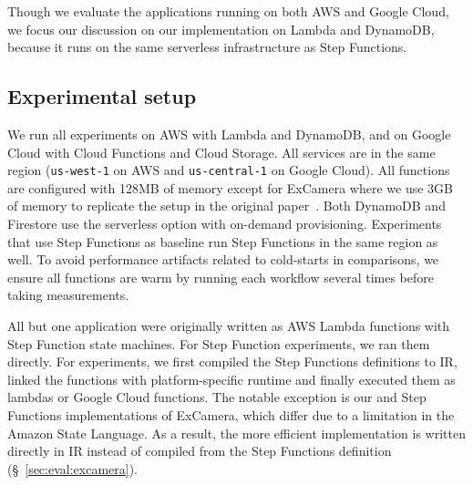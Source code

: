 



Though we evaluate the applications running on both AWS and Google Cloud, we
focus our discussion on our \name{} implementation on Lambda and DynamoDB,
because it runs on the same serverless infrastructure as Step Functions.

\subsection{Experimental setup}

We run all experiments on AWS with Lambda and DynamoDB, and on Google Cloud
with Cloud Functions and Cloud Storage. All services are in the same region
(\texttt{us-west-1} on AWS and \texttt{us-central-1} on Google Cloud). All
functions are configured with 128MB of memory except for ExCamera where we use
3GB of memory to replicate the setup in the original paper~\cite{excamera,
gg-atc}. Both DynamoDB and Firestore use the serverless option with on-demand
provisioning. Experiments that use Step Functions as baseline run Step
Functions in the same region as well. To avoid performance artifacts related
to cold-starts in comparisons, we ensure all functions are warm by running
each workflow several times before taking measurements.

All but one application were originally written as AWS Lambda functions with
Step Function state machines. For Step Function experiments, we ran them
directly. For \name{} experiments, we first compiled the Step Functions
definitions to \name{} IR, linked the functions with platform-specific runtime
and finally executed them as lambdas or Google Cloud functions. The notable
exception is our \name{} and Step Functions implementations of ExCamera, which
differ due to a limitation in the Amazon State Language. As a result, the more
efficient \name{} implementation is written directly in \name{} IR instead of
compiled from the Step Functions definition (\S~\ref{sec:eval:excamera}).

